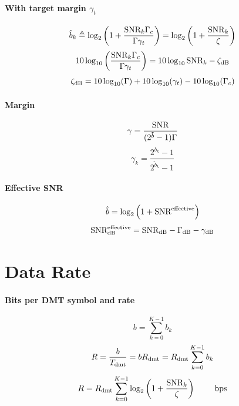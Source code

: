 \paragraph{With target margin $\gamma_t$}
\begin{equation}
\label{eq:margin}
\hat b_k \triangleq \log_2 \left(1 + \frac{{\textrm{SNR}}_k \Gamma_c}{\Gamma \gamma_t}\right) = \log_2 \left(1 + \frac{{\textrm{SNR}}_k }{\zeta}\right)
\end{equation}
\[
10 \log_{10} \left( \frac{{\textrm{SNR}}_k \Gamma_c}{\Gamma \gamma_t} \right) = 10 \log_{10} {\textrm{SNR}}_k - \zeta_{{\textrm{dB}}}
\]
\[
\zeta_{{\textrm{dB}}} = 10 \log_{10} (\Gamma) + 10 \log_{10} (\gamma_t) - 10 \log_{10} (\Gamma_c)
\]

\paragraph{Margin}
\begin{equation}
\gamma = \frac{{\textrm{SNR}}}{(2^{\tilde b} - 1) \Gamma}
\label{eq:margin_explicit}
\end{equation}
\begin{equation}
\gamma_k = \frac{2^{b_k}-1}{2^{\tilde b_k}-1}
\label{eq:margin_explicit2}
\end{equation}

\paragraph{Effective SNR}
\begin{equation}
\hat b = \log_2 \left( 1+ {\textrm{SNR}}^{\textrm{effective}} \right)
\end{equation}
\begin{equation}
{\textrm{SNR}}_{{\textrm{dB}}}^{\textrm{effective}} = {\textrm{SNR}}_{{\textrm{dB}}} - \Gamma_{{\textrm{dB}}} - \gamma_{{\textrm{dB}}}
\end{equation}

\section*{Data Rate}

\paragraph{Bits per DMT symbol and rate}
\begin{equation}
b = \sum_{k=0}^{K-1} b_k
\end{equation}
\begin{equation}
R = \frac{b}{{T_{\textrm{dmt}}}} = b {R_{\textrm{dmt}}} = {R_{\textrm{dmt}}} \sum_{k=0}^{K-1} b_k
\end{equation}
\begin{equation}
R = {R_{\textrm{dmt}}} \sum_{k=0}^{K-1} \log_2 \left(1 + \frac{{\textrm{SNR}}_k}{\zeta}\right) \textrm{~~~~~~~bps}
\label{eq:rate}
\end{equation}

